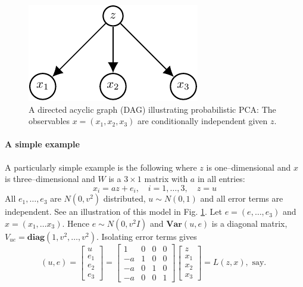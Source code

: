 \begin{Schunk}
\begin{figure}

{\centering \includegraphics{ppca1-1} 

}

\caption[A directed acyclic graph (DAG) illustrating probabilistic PCA]{A directed acyclic graph (DAG) illustrating probabilistic PCA:  The observables $x=(x_1, x_2, x_3)$ are conditionally independent given $z$.}\label{fig:ppca1}
\end{figure}
\end{Schunk}

\hypertarget{a-simple-example}{%
\paragraph{A simple example}\label{a-simple-example}}

A particularly simple example is the following where \(z\) is
one--dimensional and \(x\) is three--dimensional and \(W\) is a
\(3\times 1\) matrix with \(a\) in all entries: \[
x_i = a z + e_i, \quad i=1, \dots, 3, \quad z = u
\] All \(e_1, \dots, e_3\) are \(N(0,v^2)\) distributed,
\(u \sim N(0, 1)\) and all error terms are independent. See an
illustration of this model in Fig. \ref{fig:ppca1}. Let
\(e=(e, \dots, e_3)\) and \(x=(x_1, \dots x_3)\). Hence
\(e \sim N(0, v^2 I)\) and \(\mathbf{Var}(u,e)\) is a diagonal matrix,
\(V_{ue}=\mathbf{diag}(1, v^2, \dots, v^2)\). Isolating error terms
gives \[
(u,e)= \left[\begin{matrix}u\\e_{1}\\e_{2}\\e_{3}\end{matrix}\right] = \left[\begin{matrix}1 & 0 & 0 & 0\\- a & 1 & 0 & 0\\- a & 0 & 1 & 0\\- a & 0 & 0 & 1\end{matrix}\right] \left[\begin{matrix}z\\x_{1}\\x_{2}\\x_{3}\end{matrix}\right] = L (z,x), \mbox{ say. }
\]

